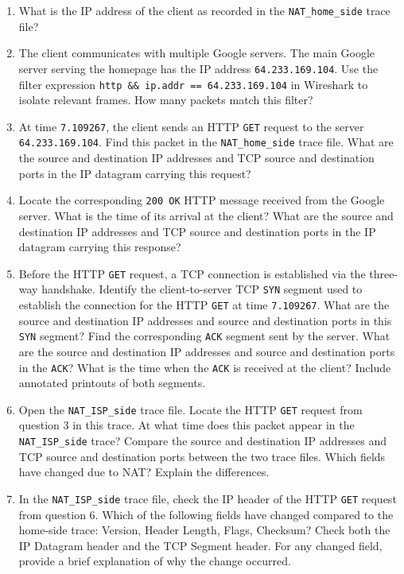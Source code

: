 \documentclass[12pt]{article}
\begin{document}
\begin{enumerate}[label=Q\arabic*:]
    \item What is the IP address of the client as recorded in the \texttt{NAT\_home\_side} trace file?

    \item The client communicates with multiple Google servers. The main Google server serving the homepage has the IP address \texttt{64.233.169.104}. Use the filter expression \texttt{http \&\& ip.addr == 64.233.169.104} in Wireshark to isolate relevant frames. How many packets match this filter?

    \item At time \texttt{7.109267}, the client sends an HTTP \texttt{GET} request to the server \texttt{64.233.169.104}. Find this packet in the \texttt{NAT\_home\_side} trace file. What are the source and destination IP addresses and TCP source and destination ports in the IP datagram carrying this request?

    \item Locate the corresponding \texttt{200 OK} HTTP message received from the Google server. What is the time of its arrival at the client? What are the source and destination IP addresses and TCP source and destination ports in the IP datagram carrying this response? 

    \item Before the HTTP \texttt{GET} request, a TCP connection is established via the three-way handshake. Identify the client-to-server TCP \texttt{SYN} segment used to establish the connection for the HTTP \texttt{GET} at time \texttt{7.109267}. What are the source and destination IP addresses and source and destination ports in this \texttt{SYN} segment? Find the corresponding \texttt{ACK} segment sent by the server. What are the source and destination IP addresses and source and destination ports in the \texttt{ACK}? What is the time when the \texttt{ACK} is received at the client? Include annotated printouts of both segments.

    \item Open the \texttt{NAT\_ISP\_side} trace file. Locate the HTTP \texttt{GET} request from question 3 in this trace. At what time does this packet appear in the \texttt{NAT\_ISP\_side} trace? Compare the source and destination IP addresses and TCP source and destination ports between the two trace files. Which fields have changed due to NAT? Explain the differences.

    \item In the \texttt{NAT\_ISP\_side} trace file, check the IP header of the HTTP \texttt{GET} request from question 6. Which of the following fields have changed compared to the home-side trace: Version, Header Length, Flags, Checksum? Check both the IP Datagram header and the TCP Segment header. For any changed field, provide a brief explanation of why the change occurred.


\end{enumerate}
\end{document}
